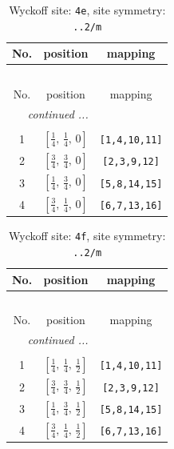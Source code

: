 \documentclass[fleqn,8pt]{jsarticle}
\begin{document}
\begin{longtable}{ccc}
\caption{Wyckoff site: {\tt 4e}, site symmetry: {\tt ..2/m}}
 \\
 \hline \hline
No. & position & mapping \\ \hline \endfirsthead

\multicolumn{2}{l}{\tablename\ \thetable{}} \\
 \hline \hline
No. & position & mapping \\ \hline \endhead

 \hline \hline
\multicolumn{2}{r}{\footnotesize\it continued ...} \\ \endfoot

 \hline \hline
\multicolumn{2}{r}{} \\ \endlastfoot

1 & $\left[ \frac{1}{4},\, \frac{1}{4},\, 0 \right]$ & {\tt [1,4,10,11]} \\ \hline
2 & $\left[ \frac{3}{4},\, \frac{3}{4},\, 0 \right]$ & {\tt [2,3,9,12]} \\ \hline
3 & $\left[ \frac{1}{4},\, \frac{3}{4},\, 0 \right]$ & {\tt [5,8,14,15]} \\ \hline
4 & $\left[ \frac{3}{4},\, \frac{1}{4},\, 0 \right]$ & {\tt [6,7,13,16]} \\
\end{longtable}
\renewcommand{\arraystretch}{1.2}
\begin{longtable}{ccc}
\caption{Wyckoff site: {\tt 4f}, site symmetry: {\tt ..2/m}}
 \\
 \hline \hline
No. & position & mapping \\ \hline \endfirsthead

\multicolumn{2}{l}{\tablename\ \thetable{}} \\
 \hline \hline
No. & position & mapping \\ \hline \endhead

 \hline \hline
\multicolumn{2}{r}{\footnotesize\it continued ...} \\ \endfoot

 \hline \hline
\multicolumn{2}{r}{} \\ \endlastfoot

1 & $\left[ \frac{1}{4},\, \frac{1}{4},\, \frac{1}{2} \right]$ & {\tt [1,4,10,11]} \\ \hline
2 & $\left[ \frac{3}{4},\, \frac{3}{4},\, \frac{1}{2} \right]$ & {\tt [2,3,9,12]} \\ \hline
3 & $\left[ \frac{1}{4},\, \frac{3}{4},\, \frac{1}{2} \right]$ & {\tt [5,8,14,15]} \\ \hline
4 & $\left[ \frac{3}{4},\, \frac{1}{4},\, \frac{1}{2} \right]$ & {\tt [6,7,13,16]} \\
\end{longtable}
\end{document}
